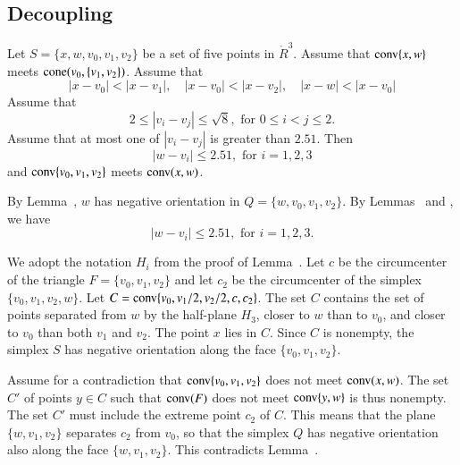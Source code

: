 \begin{tarskidata}
\begin{tarski}
\section{Decoupling}

\begin{lemma}
Let $S=\{x,w,v_0,v_1,v_2\}$ be a set of five points
in $\ring{R}^3$.  Assume that
  ${\operatorname{conv}}\{x,w\}$ meets ${\operatorname{cone}}(v_0,\{v_1,v_2\})$.  
Assume that
  $$
  |x-v_0| < |x-v_1|,\quad 
  |x-v_0| < |x-v_2|,\quad
  |x-w| < |x-v_0|
  $$
Assume that 
  $$
  2\le |v_i-v_j|\le \sqrt{8}, \text{ for } 0\le i < j \le 2.
  $$
Assume that at most one of $|v_i-v_j|$ is greater than $2.51$.
Then
  $$|w-v_i|\le 2.51,\text{ for } i=1,2,3$$
and ${\operatorname{conv}}\{v_0,v_1,v_2\}$ meets ${\operatorname{conv}}(x,w)$.
\end{lemma}


\begin{proved}
By Lemma~, $w$ has negative orientation
in $Q=\{w,v_0,v_1,v_2\}$.
By
Lemmas~ and ,
we have
  $$|w-v_i|\le 2.51,\text{ for } i=1,2,3.$$

We adopt the notation $H_i$ from the proof of
Lemma~.
Let $c$ be the circumcenter of the triangle $F=\{v_0,v_1,v_2\}$ and
let $c_2$ be the circumcenter of the simplex $\{v_0,v_1,v_2,w\}$.
Let $C={\operatorname{conv}}\{v_0,v_1/2,v_2/2,c,c_2\}$.  The set
$C$ contains the set of points separated from $w$ by the
half-plane $H_3$, closer to $w$ than to $v_0$, and closer to $v_0$
than both $v_1$ and $v_2$. The point $x$ lies in
$C$. Since $C$ is nonempty, the simplex $S$ has
negative orientation along the face $\{v_0,v_1,v_2\}$.

Assume for a contradiction that ${\operatorname{conv}}\{v_0,v_1,v_2\}$
does not meet ${\operatorname{conv}}(x,w)$.
The set $C'$ of points $y\in C$ such that 
  ${\operatorname{conv}}(F)$ does not meet ${\operatorname{conv}}\{y,w\}$ is thus
nonempty. The set $C'$ must include the extreme point $c_2$ of
$C$. This means that the plane $\{w,v_1,v_2\}$ separates $c_2$
from $v_0$, so that the simplex $Q$ has negative orientation
also along the face $\{w,v_1,v_2\}$.  This contradicts
Lemma~.
\swallowed\end{proved}
\end{tarski}







\end{tarskidata}
